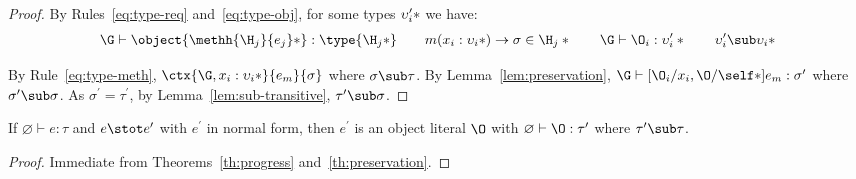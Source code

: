 \begin{theorem}[Preservation]
\begin{proof}
    \noindent By Rules~\ref{eq:type-req} and~\ref{eq:type-obj}, for some types
    $\*\upsilon^\prime_i*$ we have:
%
    \begin{displaymath}
      \G \vdash \object{\*\methh{\H_j}{e_j}*} : \type{\*\H_j*} \quad\quad
      m(\*x_i : \upsilon_i*) \to \sigma \in \*\H_j* \quad\quad
      \G \vdash \*\O_i : \upsilon^\prime_i* \quad\quad
      \*\upsilon^\prime_i \sub \upsilon_i*
    \end{displaymath}

    \noindent By Rule~\ref{eq:type-meth}, $\ctx{\G,\*x_i :
    \upsilon_i*}{e_m}{\sigma}$ where $\sigma \sub \tau$. By
    Lemma~\ref{lem:preservation}, $\G \vdash [\*\O_i/x_i,\O/\self*]e_m :
    \sigma^\prime$ where $\sigma^\prime \sub \sigma$.  As $\sigma^\prime =
    \tau^\prime$, by Lemma~\ref{lem:sub-transitive}, $\tau^\prime \sub \sigma$.
  \end{proof}

\end{theorem}

\begin{theorem}\label{th:type-soundness}
  If $\varnothing \vdash e : \tau$ and $e \stot e^\prime$ with $e^\prime$ in
  normal form, then $e^\prime$ is an object literal $\O$ with $\varnothing
  \vdash \O : \tau^\prime$ where $\tau^\prime \sub \tau$.

  \begin{proof}
    Immediate from Theorems~\ref{th:progress} and~\ref{th:preservation}.
  \end{proof}
\end{theorem}

